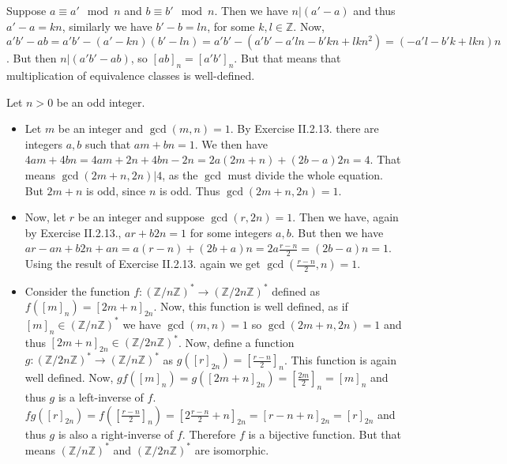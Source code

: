 \begin{problem}
\end{problem}

\begin{solution}
	Suppose $a \equiv a' \mod n$ and $b \equiv b' \mod n$. Then we have $n | (a' - a)$ and thus $a' - a = kn$, similarly we have $b' - b = ln$, for some $k,l \in \mathbb{Z}$. Now, $a'b'-ab=a'b'-(a'-kn)(b'-ln)=a'b'-(a'b'-a'ln-b'kn+lkn^2)=(-a'l-b'k+lkn)n$. But then $n | (a'b'-ab)$, so $[ab]_n=[a'b']_n$. But that means that multiplication of equivalence classes is well-defined.
\end{solution}

\begin{problem}
\end{problem}

\begin{solution}
	Let $n > 0$ be an odd integer.
	\begin{itemize}
		\item Let $m$ be an integer and $\gcd(m,n)=1$. By Exercise II.2.13. there are integers $a,b$ such that $am+bn=1$. We then have $4am+4bn=4am+2n+4bn-2n=2a(2m+n)+(2b-a)2n=4$. That means $\gcd(2m+n,2n) | 4$, as the $\gcd$ must divide the whole equation. But $2m+n$ is odd, since $n$ is odd. Thus $\gcd(2m+n,2n)=1$.
		\item Now, let $r$ be an integer and suppose $\gcd(r,2n)=1$. Then we have, again by Exercise II.2.13., $ar+b2n=1$ for some integers $a,b$. But then we have $ar-an+b2n+an=a(r-n)+(2b+a)n=2a\frac{r-n}{2}=(2b-a)n=1$. Using the result of Exercise II.2.13. again we get $\gcd(\frac{r-n}{2},n)=1$.
		\item Consider the function $f: (\mathbb{Z}/n\mathbb{Z})^* \to (\mathbb{Z}/2n\mathbb{Z})^*$ defined as $f([m]_n)=[2m+n]_{2n}$. Now, this function is well defined, as if $[m]_n \in (\mathbb{Z}/n\mathbb{Z})^*$ we have $\gcd(m,n)=1$ so $\gcd(2m+n,2n)=1$ and thus $[2m+n]_{2n} \in (\mathbb{Z}/2n\mathbb{Z})^*$. Now, define a function $g: (\mathbb{Z}/2n\mathbb{Z})^* \to (\mathbb{Z}/n\mathbb{Z})^*$ as $g([r]_{2n})=[\frac{r-n}{2}]_n$. This function is again well defined. Now, $gf([m]_n)=g([2m+n]_{2n})=[\frac{2m}{2}]_n=[m]_n$ and thus $g$ is a left-inverse of $f$. $fg([r]_{2n})=f([\frac{r-n}{2}]_n)=[2\frac{r-n}{2} + n]_{2n}=[r-n+n]_{2n}=[r]_{2n}$ and thus $g$ is also a right-inverse of $f$. Therefore $f$ is a bijective function. But that means $(\mathbb{Z}/n\mathbb{Z})^*$ and $(\mathbb{Z}/2n\mathbb{Z})^*$ are isomorphic. \qedhere
	\end{itemize}
\end{solution}

